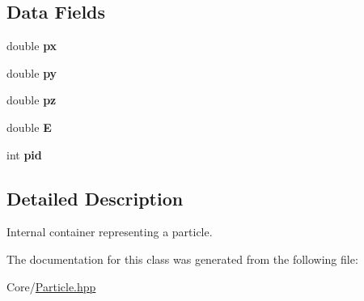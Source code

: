 \subsection*{Data Fields}
\begin{DoxyCompactItemize}
\item 
\hypertarget{struct_particle_a2b4a2387122f9029548de4c237e2c9c6}{double {\bfseries px}}\label{struct_particle_a2b4a2387122f9029548de4c237e2c9c6}

\item 
\hypertarget{struct_particle_a520405a04f53ac2602801385d2290e1b}{double {\bfseries py}}\label{struct_particle_a520405a04f53ac2602801385d2290e1b}

\item 
\hypertarget{struct_particle_ad3e28a3b7126f0fcc1ee73e19a1f5d30}{double {\bfseries pz}}\label{struct_particle_ad3e28a3b7126f0fcc1ee73e19a1f5d30}

\item 
\hypertarget{struct_particle_a422e2bc2a6b1000085ba4663586168ed}{double {\bfseries E}}\label{struct_particle_a422e2bc2a6b1000085ba4663586168ed}

\item 
\hypertarget{struct_particle_a678a1fd3877db17eeefe1bb3017c18a5}{int {\bfseries pid}}\label{struct_particle_a678a1fd3877db17eeefe1bb3017c18a5}

\end{DoxyCompactItemize}


\subsection{Detailed Description}
Internal container representing a particle. 

The documentation for this class was generated from the following file\-:\begin{DoxyCompactItemize}
\item 
Core/\hyperlink{_particle_8hpp}{Particle.\-hpp}\end{DoxyCompactItemize}
